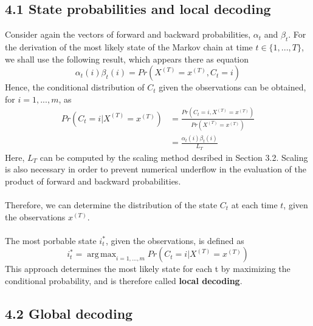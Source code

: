 \documentclass{article}
\DeclareMathOperator*{\argmax}{arg\,max}
\begin{document}
\subsection*{4.1 State probabilities and local decoding}
Consider again the vectors of forward and backward probabilities, $\alpha_t$ and $\beta_t$. For the derivation of the most likely state of the Markov chain at time $t \in \{1, ..., T\}$, we shall use the following result, which appears there as equation
$$\alpha_t(i) \beta_t(i) = Pr(X^{(T)} = x^{(T)}, C_t = i)$$
Hence, the conditional distribution of $C_t$ given the observations can be obtained, for $i = 1, ..., m$, as \\
\begin{align}
    Pr(C_t = i | X^{(T)} = x^{(T)}) & = \frac{Pr(C_t = i, X^{(T)} = x^{(T)})}{Pr(X^{(T)} = x^{(T)})} \\
    & = \frac{\alpha_t(i)\beta_t(i)}{L_T}
\end{align}
Here, $L_T$ can be computed by the scaling method desribed in Section 3.2. Scaling is also necessary in order to prevent numerical underflow in the evaluation of the product of forward and backward probabilities. \\
\\
Therefore, we can determine the distribution of the state $C_t$ at each time $t$, given the observations $x^{(T)}$. \\
\\
The most porbable state $i_t^*$, given the observations, is defined as
$$i_t^* = \argmax_{i=1, ..., m} Pr(C_t = i | X^{(T)} = x^{(T)})$$
This approach determines the most likely state for each t by maximizing the conditional probability, and is therefore called \textbf{local decoding}.

\subsection*{4.2 Global decoding}
\end{document}
